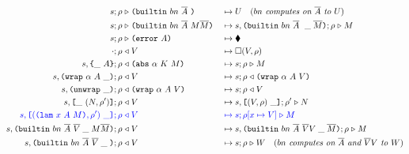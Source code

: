 \begin{figure}[!ht]
\begin{subfigure}[c]{\linewidth}
{\begin{alignat*}{2}
      s; \rho &\compute \builtin{bn}{\repetition{A}}{} &{}\mapsto{}& U \quad (\textit{$bn$ computes on $\repetition{A}$ to $U$})\\
      s; \rho &\compute \builtin{bn}{\repetition{A}}{M \repetition{M}} &{}\mapsto{}& s,\inBuiltin{bn}{\repetition{A}}{}{\_}{\repetition{M}};\rho \compute M\\
      s; \rho &\compute \error{A} &{}\mapsto{}& \ckerror{}\\
      \cdot; \rho &\return V &{}\mapsto{}& \square (V, \rho)\\
      s,\inInstLeftFrame{A}; \rho &\return \abs{\alpha}{K}{M} &{}\mapsto{}& s;\rho \compute{M} \\
      s,\inWrapRightFrame{\alpha}{A}; \rho &\return V &{}\mapsto{}& s;\rho \return \wrap{\alpha}{A}{V}\\
      s,\inUnwrapFrame{}; \rho &\return \wrap{\alpha}{A}{V} &{}\mapsto{}& s;\rho \return V\\
      s,\inAppLeftFrame{(N,\rho^{\prime})}; \rho &\return V &{}\mapsto{}& s, \inAppRightFrame{(V,\rho)};\rho^{\prime} \compute N\\
      \blue{s,\inAppRightFrame{(\lam{x}{A}{M}, \rho^{\prime})}; \rho} &\breturn V &{}\bmapsto{}& \blue{s;\rho[x\mapsto V] \compute M}\\  %
      s,  \inBuiltin{bn}{\repetition{A}}{\repetition{V}}{\_}{M \repetition{M}}{}; \rho&\return V &{}\mapsto{}& s, \inBuiltin{bn}{\repetition{A}}{\repetition{V} V}{\_}{\repetition{M}};\rho \compute M\\
      s,\inBuiltin {bn} {\repetition{A}} {\repetition{V}}{\_}{}; \rho &\return V 
                                                &{}\mapsto{}& s;\rho \compute W \quad (\textit{$bn$ computes on $\repetition{A}$ and $\repetition{V}V$ to $W$})\\
\end{alignat*}
}
\end{subfigure}
\end{figure}


